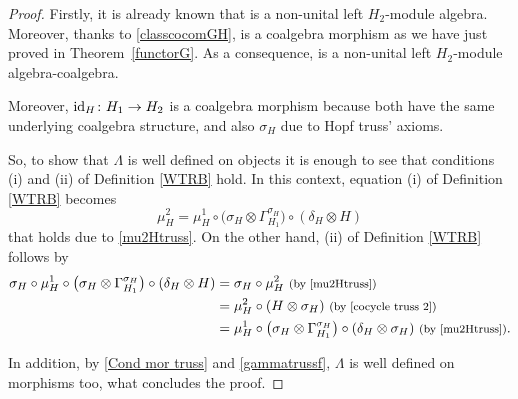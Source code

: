 \documentclass[10pt,a4paper]{amsart}
\numberwithin{equation}{section}
\begin{document}
\begin{proof}
Firstly, it is already known that  is a non-unital left $H_{2}$-module algebra. Moreover, thanks to \eqref{classcocomGH},  is a coalgebra morphism as we have just proved in Theorem~\ref{functorG}. As a consequence,  is a non-unital left $H_{2}$-module algebra-coalgebra.

Moreover, ${\rm id}_{H}\colon H_{1}\rightarrow H_{2}$ is a coalgebra morphism because both have the same underlying coalgebra structure, and also $\sigma_{H}$ due to Hopf truss' axioms.

So, to show that $\Lambda$ is well defined on objects it is enough to see that conditions (i) and (ii) of Definition \ref{WTRB} hold. In this context, equation (i) of Definition \ref{WTRB} becomes
\[
\mu_{H}^{2}=\mu_{H}^{1}\circ\bigl(\sigma_{H}\otimes\Gamma_{H_{1}}^{\sigma_{H}}\bigr)\circ(\delta_{H}\otimes H)
\]
 that holds due to \eqref{mu2Htruss}. On the other hand, (ii) of Definition \ref{WTRB} follows by
\begin{align*}
\sigma_{H}\circ\mu_{H}^{1}\circ\bigl(\sigma_{H}\otimes\Gamma_{H_{1}}^{\sigma_{H}}\bigr)\circ(\delta_{H}\otimes H)
={}&\sigma_{H}\circ\mu_{H}^{2}\ \text{\footnotesize\textnormal{(by \eqref{mu2Htruss})}}\\
={}&\mu_{H}^{2}\circ(H\otimes\sigma_{H})\ \text{\footnotesize\textnormal{(by \eqref{cocycle truss 2})}}\\
={}&\mu_{H}^{1}\circ\bigl(\sigma_{H}\otimes\Gamma_{H_{1}}^{\sigma_{H}}\bigr)\circ(\delta_{H}\otimes\sigma_{H})\ \text{\footnotesize\textnormal{(by \eqref{mu2Htruss})}}.
\end{align*}

In addition, by \eqref{Cond mor truss} and \eqref{gammatrussf}, $\Lambda$ is well defined on morphisms too, what concludes the proof.
\end{proof}
\end{document}
